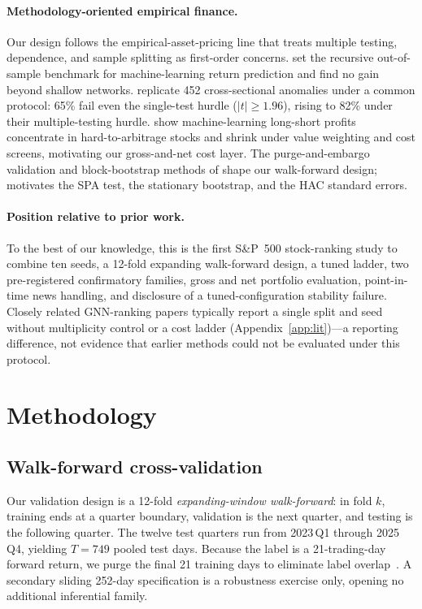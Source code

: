 \documentclass{article}
\begin{document}
\paragraph{Methodology-oriented empirical finance.} Our design follows the empirical-asset-pricing line that treats multiple testing, dependence, and sample splitting as first-order concerns. \citet{gu2020ml} set the recursive out-of-sample benchmark for machine-learning return prediction and find no gain beyond shallow networks. \citet{hou2020replicating} replicate 452 cross-sectional anomalies under a common protocol: 65\% fail even the single-test hurdle ($|t|\ge1.96$), rising to 82\% under their multiple-testing hurdle. \citet{avramov2023ml} show machine-learning long-short profits concentrate in hard-to-arbitrage stocks and shrink under value weighting and cost screens, motivating our gross-and-net cost layer. The purge-and-embargo validation and block-bootstrap methods of \citet{lopezdeprado2018advances} shape our walk-forward design; \citet{hansen2005spa} motivates the SPA test, \citet{politis1994stationary} the stationary bootstrap, and \citet{newey1987simple} the HAC standard errors.

\paragraph{Position relative to prior work.} To the best of our knowledge, this is the first S\&P~500 stock-ranking study to combine ten seeds, a 12-fold expanding walk-forward design, a tuned ladder, two pre-registered confirmatory families, gross and net portfolio evaluation, point-in-time news handling, and disclosure of a tuned-configuration stability failure. Closely related GNN-ranking papers typically report a single split and seed without multiplicity control or a cost ladder (Appendix~\ref{app:lit})---a reporting difference, not evidence that earlier methods could not be evaluated under this protocol.

\section{Methodology}\label{sec:method}

\subsection{Walk-forward cross-validation}
Our validation design is a 12-fold \emph{expanding-window walk-forward}: in fold $k$, training ends at a quarter boundary, validation is the next quarter, and testing is the following quarter. The twelve test quarters run from 2023\,Q1 through 2025\,Q4, yielding $T=749$ pooled test days. Because the label is a 21-trading-day forward return, we purge the final 21 training days to eliminate label overlap~\citep{lopezdeprado2018advances}. A secondary sliding 252-day specification is a robustness exercise only, opening no additional inferential family.
\end{document}
